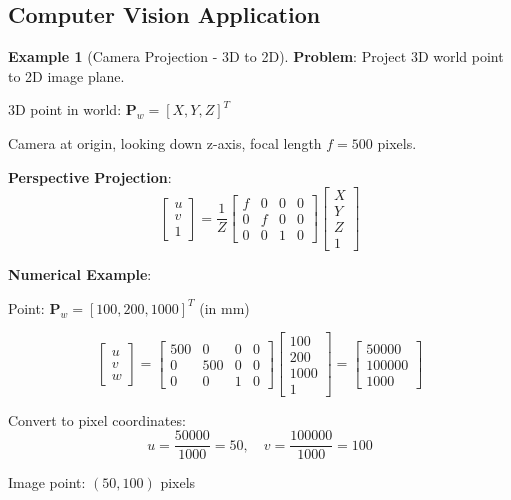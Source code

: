\documentclass[12pt,a4paper]{article}
\theoremstyle{definition}
\newtheorem{example}{Example}[section]
\begin{document}
\subsection{Computer Vision Application}

\begin{example}[Camera Projection - 3D to 2D]
\textbf{Problem}: Project 3D world point to 2D image plane.

3D point in world: $\mathbf{P}_w = [X, Y, Z]^T$

Camera at origin, looking down z-axis, focal length $f = 500$ pixels.

\textbf{Perspective Projection}:
\[
\begin{bmatrix}
u \\ v \\ 1
\end{bmatrix}
= \frac{1}{Z}
\begin{bmatrix}
f & 0 & 0 & 0 \\
0 & f & 0 & 0 \\
0 & 0 & 1 & 0
\end{bmatrix}
\begin{bmatrix}
X \\ Y \\ Z \\ 1
\end{bmatrix}
\]

\textbf{Numerical Example}:

Point: $\mathbf{P}_w = [100, 200, 1000]^T$ (in mm)

\[
\begin{bmatrix}
u \\ v \\ w
\end{bmatrix}
= \begin{bmatrix}
500 & 0 & 0 & 0 \\
0 & 500 & 0 & 0 \\
0 & 0 & 1 & 0
\end{bmatrix}
\begin{bmatrix}
100 \\ 200 \\ 1000 \\ 1
\end{bmatrix}
= \begin{bmatrix}
50000 \\ 100000 \\ 1000
\end{bmatrix}
\]

Convert to pixel coordinates:
\[
u = \frac{50000}{1000} = 50, \quad v = \frac{100000}{1000} = 100
\]

Image point: $(50, 100)$ pixels
\end{example}
\end{document}
